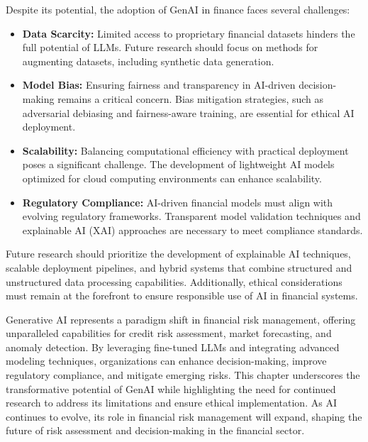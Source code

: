 \documentclass[a4paper,headinclude=on,footinclude=on,12pt,oneside]{scrbook}
\begin{document}
	
	Despite its potential, the adoption of GenAI in finance faces several challenges:
	
	\begin{itemize}
		\item \textbf{Data Scarcity:} Limited access to proprietary financial datasets hinders the full potential of LLMs. Future research should focus on methods for augmenting datasets, including synthetic data generation.
		\item \textbf{Model Bias:} Ensuring fairness and transparency in AI-driven decision-making remains a critical concern. Bias mitigation strategies, such as adversarial debiasing and fairness-aware training, are essential for ethical AI deployment.
		\item \textbf{Scalability:} Balancing computational efficiency with practical deployment poses a significant challenge. The development of lightweight AI models optimized for cloud computing environments can enhance scalability.
		\item \textbf{Regulatory Compliance:} AI-driven financial models must align with evolving regulatory frameworks. Transparent model validation techniques and explainable AI (XAI) approaches are necessary to meet compliance standards.
	\end{itemize}
	
	Future research should prioritize the development of explainable AI techniques, scalable deployment pipelines, and hybrid systems that combine structured and unstructured data processing capabilities. Additionally, ethical considerations must remain at the forefront to ensure responsible use of AI in financial systems.
	
	
	Generative AI represents a paradigm shift in financial risk management, offering unparalleled capabilities for credit risk assessment, market forecasting, and anomaly detection. By leveraging fine-tuned LLMs and integrating advanced modeling techniques, organizations can enhance decision-making, improve regulatory compliance, and mitigate emerging risks. This chapter underscores the transformative potential of GenAI while highlighting the need for continued research to address its limitations and ensure ethical implementation. As AI continues to evolve, its role in financial risk management will expand, shaping the future of risk assessment and decision-making in the financial sector.
	
\end{document}
